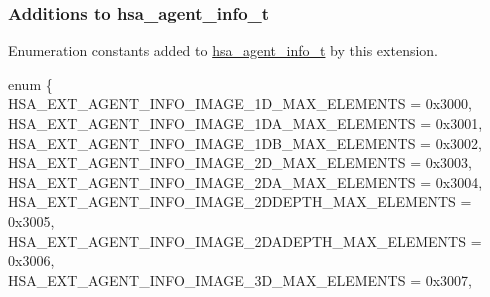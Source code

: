 \documentclass[final,oneside]{book}
\newcommand{\reftyp}[1]{#1}
\newcommand{\refenu}[1]{\reftyp{#1}}
\newenvironment{mylongtable}{\rowcolors{0}{lightgray}{lightgray}\longtable} {
\endlongtable}
\begin{document}
\subsubsection{Additions to hsa_\-agent_\-info_\-t}
\vspace{-2.5mm}Enumeration constants added to \hyperlink{group__agentinfo_1ga39d0684207d95717d96319573b3e4a42}{hsa_\-agent_\-info_\-t} by this extension.\begin{mylongtable}{@{}p{\textwidth}}
\rule{0pt}{3ex}enum \{\\\hspace{1.7em}\hypertarget{group__ext-images_1gga99fb83031ce9923c84392b4e92f956b5aec34e7fe9f6f42ecbc1e72b48956fe5e}{\refenu{HSA_\-EXT_\-AGENT_\-INFO_\-IMAGE_\-1D_\-MAX_\-ELEMENTS}} = 0x3000,\\
\hspace{1.7em}\hypertarget{group__ext-images_1gga99fb83031ce9923c84392b4e92f956b5ab597cd205855caea8a58fbe9256a001f}{\refenu{HSA_\-EXT_\-AGENT_\-INFO_\-IMAGE_\-1DA_\-MAX_\-ELEMENTS}} = 0x3001,\\
\hspace{1.7em}\hypertarget{group__ext-images_1gga99fb83031ce9923c84392b4e92f956b5a145fa8a0ef85752e1e21966f88ffd85f}{\refenu{HSA_\-EXT_\-AGENT_\-INFO_\-IMAGE_\-1DB_\-MAX_\-ELEMENTS}} = 0x3002,\\
\hspace{1.7em}\hypertarget{group__ext-images_1gga99fb83031ce9923c84392b4e92f956b5ac36ca2ff9c2b82444410acc2c05750c7}{\refenu{HSA_\-EXT_\-AGENT_\-INFO_\-IMAGE_\-2D_\-MAX_\-ELEMENTS}} = 0x3003,\\
\hspace{1.7em}\hypertarget{group__ext-images_1gga99fb83031ce9923c84392b4e92f956b5a9ee2d789843a03ae02bbd8cf44465ec6}{\refenu{HSA_\-EXT_\-AGENT_\-INFO_\-IMAGE_\-2DA_\-MAX_\-ELEMENTS}} = 0x3004,\\
\hspace{1.7em}\hypertarget{group__ext-images_1gga99fb83031ce9923c84392b4e92f956b5a15262e3b83a1ff50af219c186b70ccde}{\refenu{HSA_\-EXT_\-AGENT_\-INFO_\-IMAGE_\-2DDEPTH_\-MAX_\-ELEMENTS}} = 0x3005,\\
\hspace{1.7em}\hypertarget{group__ext-images_1gga99fb83031ce9923c84392b4e92f956b5abeb08bb9caae027b3d11d700aff4b306}{\refenu{HSA_\-EXT_\-AGENT_\-INFO_\-IMAGE_\-2DADEPTH_\-MAX_\-ELEMENTS}} = 0x3006,\\
\hspace{1.7em}\hypertarget{group__ext-images_1gga99fb83031ce9923c84392b4e92f956b5a433a88189e85f3050829d04dd07b0667}{\refenu{HSA_\-EXT_\-AGENT_\-INFO_\-IMAGE_\-3D_\-MAX_\-ELEMENTS}} = 0x3007,\\

\end{mylongtable}
\end{document}
